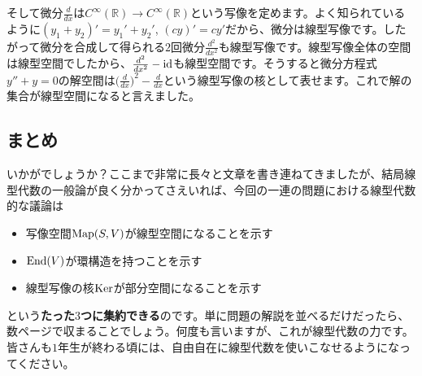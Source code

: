 そして微分$\frac{d}{dx}$は$C^{\infty}(\mathbb{R}) \rightarrow C^{\infty}(\mathbb{R})$という写像を定めます。よく知られているように$(y_1 + y_2)' = y_1' + y_2'$, $(cy)' = cy'$だから、微分は線型写像です。したがって微分を合成して得られる$2$回微分$\frac{d^2}{dx^2}$も線型写像です。線型写像全体の空間は線型空間でしたから、$\frac{d^2}{dx^2}-\operatorname{id}$も線型空間です。そうすると微分方程式$y'' + y = 0$の解空間は$\bigl(\frac{d}{dx}\bigr)^2 - \frac{d}{dx}$という線型写像の核として表せます。これで解の集合が線型空間になると言えました。

\subsection{まとめ}

いかがでしょうか？ここまで非常に長々と文章を書き連ねてきましたが、結局線型代数の一般論が良く分かってさえいれば、今回の一連の問題における線型代数的な議論は
\begin{itemize}
\item 写像空間$\operatorname{Map}(S, V)$が線型空間になることを示す
\item $\operatorname{End}(V)$が環構造を持つことを示す
\item 線型写像の核$\operatorname{Ker}$が部分空間になることを示す
\end{itemize}
という\textbf{たった$3$つに集約できる}のです。単に問題の解説を並べるだけだったら、数ページで収まることでしょう。何度も言いますが、これが線型代数の力です。皆さんも$1$年生が終わる頃には、自由自在に線型代数を使いこなせるようになってください。

